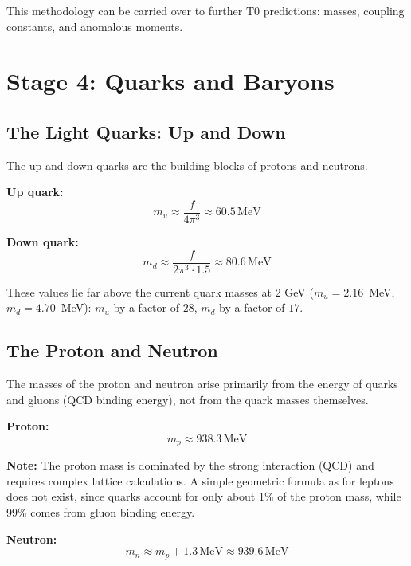 	This methodology can be carried over to further T0 predictions: masses, coupling constants, and anomalous moments.
	
	\section{Stage 4: Quarks and Baryons}
	
	\subsection{The Light Quarks: Up and Down}
	
	The up and down quarks are the building blocks of protons and neutrons.
	
	\textbf{Up quark:}
	\begin{equation}
		m_u \approx \frac{f}{4\pi^3} \approx 60.5\,\text{MeV}
	\end{equation}
	
	\textbf{Down quark:}
	\begin{equation}
		m_d \approx \frac{f}{2\pi^3 \cdot 1.5} \approx 80.6\,\text{MeV}
	\end{equation}
	
	These values lie far above the current quark masses at 2 GeV ($m_u = 2.16$~MeV, $m_d = 4.70$~MeV): $m_u$ by a factor of $28$, $m_d$ by a factor of $17$.
	
	\subsection{The Proton and Neutron}
	
	The masses of the proton and neutron arise primarily from the energy of quarks and gluons (QCD binding energy), not from the quark masses themselves.
	
	\textbf{Proton:}
	\begin{equation}
		m_p \approx 938.3\,\text{MeV}
	\end{equation}
	
	\textbf{Note:} The proton mass is dominated by the strong interaction (QCD) and requires complex lattice calculations. A simple geometric formula as for leptons does not exist, since quarks account for only about 1\% of the proton mass, while 99\% comes from gluon binding energy.
	
	\textbf{Neutron:}
	\begin{equation}
		m_n \approx m_p + 1.3\,\text{MeV} \approx 939.6\,\text{MeV}
	\end{equation}
	
